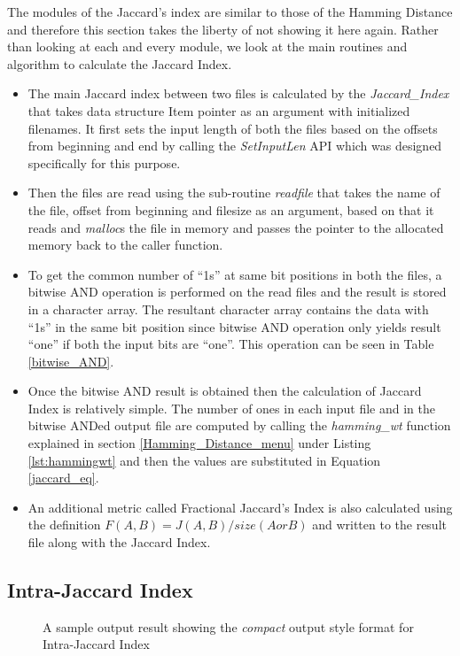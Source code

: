 	The modules of the Jaccard's index are similar to those of the Hamming Distance and therefore this section takes the liberty of not showing it here again.
	Rather than looking at each and every module, we look at the main routines and algorithm to calculate the Jaccard Index.
	\begin{itemize}
		\item The main Jaccard index between two files is calculated by the \emph{Jaccard\_Index} that takes data structure Item pointer as an argument with initialized filenames. It first sets the input length of both the files based on the offsets from beginning and end by calling the \emph{SetInputLen} API which was designed specifically for this purpose.
		\item Then the files are read using the sub-routine \emph{readfile} that takes the name of the file, offset from beginning and filesize as an argument, based on that it reads and \emph{malloc}s the file in memory and passes the pointer to the allocated memory back to the caller function.
		\item To get the common number of ``1s'' at same bit positions in both the files, a bitwise AND operation is performed on the read files and the result is stored in a character array. The resultant character array contains the data with ``1s'' in the same bit position since bitwise AND operation only yields result ``one'' if both the input bits are ``one''. This operation can be seen in Table \ref{bitwise_AND}.
		\item Once the bitwise AND result is obtained then the calculation of Jaccard Index is relatively simple. The number of ones in each input file and in the bitwise ANDed output file are computed by calling the \emph{hamming\_wt} function explained in section \ref{Hamming_Distance_menu} under Listing \ref{lst:hammingwt} and then the values are substituted in Equation \ref{jaccard_eq}.
	\item An additional metric called Fractional Jaccard's Index is also calculated using the definition $F(A, B) = J(A, B)/ size(A or B)$ and written to the result file along with the Jaccard Index.
\end{itemize}

\subsection{Intra-Jaccard Index}
\begin{figure}[h!]
\centering
{}
\caption{A sample output result showing the \emph{compact} output style format for Intra-Jaccard Index }
\label{img:intra_jaccardi_compact}
\end{figure}

